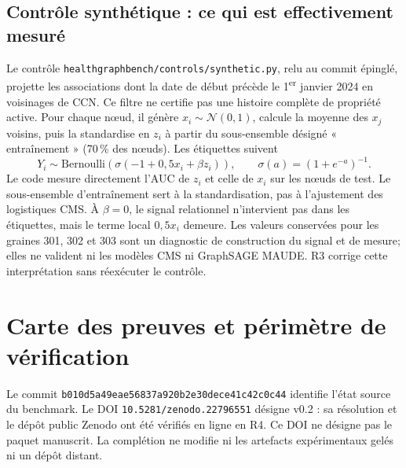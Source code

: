 \documentclass[10pt,a4paper]{article}
\newcommand{\src}[1]{{\small\nolinkurl{#1}}}
\begin{document}
\par{}
\subsection{Contrôle synthétique : ce qui est effectivement mesuré}
\label{supp:control}
Le contrôle \src{healthgraphbench/controls/synthetic.py}, relu au commit épinglé, projette les associations dont la date de début précède le 1\textsuperscript{er} janvier 2024 en voisinages de CCN. Ce filtre ne certifie pas une histoire complète de propriété active. Pour chaque nœud, il génère $x_i\sim\mathcal N(0,1)$, calcule la moyenne des $x_j$ voisins, puis la standardise en $z_i$ à partir du sous-ensemble désigné « entraînement » (70\,\% des nœuds). Les étiquettes suivent
\[
Y_i\sim\mathrm{Bernoulli}\!\left(\sigma(-1+0,5x_i+\beta z_i)\right),
\qquad \sigma(a)=(1+e^{-a})^{-1}.
\]
Le code mesure directement l'AUC de $z_i$ et celle de $x_i$ sur les nœuds de test. Le sous-ensemble d'entraînement sert à la standardisation, pas à l'ajustement des logistiques CMS. À $\beta=0$, le signal relationnel n'intervient pas dans les étiquettes, mais le terme local $0,5x_i$ demeure. Les valeurs conservées pour les graines 301, 302 et 303 sont un diagnostic de construction du signal et de mesure; elles ne valident ni les modèles CMS ni GraphSAGE MAUDE\cite{hgbcontrols}. R3 corrige cette interprétation sans réexécuter le contrôle.


\section{Carte des preuves et périmètre de vérification}
\label{supp:evidence}
Le commit \nolinkurl{b010d5a49eae56837a920b2e30dece41c42c0c44} identifie l'état source du benchmark\cite{hgb2026,hgbresults}. Le DOI \nolinkurl{10.5281/zenodo.22796551} désigne v0.2 : sa résolution et le dépôt public Zenodo ont été vérifiés en ligne en R4. Ce DOI ne désigne pas le paquet manuscrit. La complétion ne modifie ni les artefacts expérimentaux gelés ni un dépôt distant.
\end{document}
